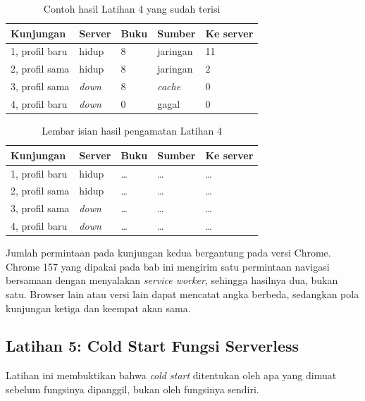 \begin{table}[!htb]
  \centering
  \caption{Contoh hasil Latihan 4 yang sudah terisi}
  \label{tab:c14-lat4-contoh}
  \begin{tabularx}{\textwidth}{Xllll}
    \hline
    \textbf{Kunjungan} & \textbf{Server} & \textbf{Buku} & \textbf{Sumber} & \textbf{Ke server} \\
    \hline
    1, profil baru & hidup & 8 & jaringan & 11 \\
    \hline
    2, profil sama & hidup & 8 & jaringan & 2 \\
    \hline
    3, profil sama & \textit{down} & 8 & \textit{cache} & 0 \\
    \hline
    4, profil baru & \textit{down} & 0 & gagal & 0 \\
    \hline
  \end{tabularx}
\end{table}

\begin{table}[!htb]
  \centering
  \caption{Lembar isian hasil pengamatan Latihan 4}
  \label{tab:c14-lat4-hasil}
  \begin{tabularx}{\textwidth}{Xllll}
    \hline
    \textbf{Kunjungan} & \textbf{Server} & \textbf{Buku} & \textbf{Sumber} & \textbf{Ke server} \\
    \hline
    1, profil baru & hidup & \dots & \dots & \dots \\
    \hline
    2, profil sama & hidup & \dots & \dots & \dots \\
    \hline
    3, profil sama & \textit{down} & \dots & \dots & \dots \\
    \hline
    4, profil baru & \textit{down} & \dots & \dots & \dots \\
    \hline
  \end{tabularx}
\end{table}

Jumlah permintaan pada kunjungan kedua bergantung pada versi Chrome. Chrome
157 yang dipakai pada bab ini mengirim satu permintaan navigasi bersamaan
dengan menyalakan \textit{service worker}, sehingga hasilnya dua, bukan satu.
Browser lain atau versi lain dapat mencatat angka berbeda, sedangkan pola
kunjungan ketiga dan keempat akan sama.

\subsection*{Latihan 5: Cold Start Fungsi Serverless}

Latihan ini membuktikan bahwa \textit{cold start} ditentukan oleh apa yang
dimuat sebelum fungsinya dipanggil, bukan oleh fungsinya sendiri.

